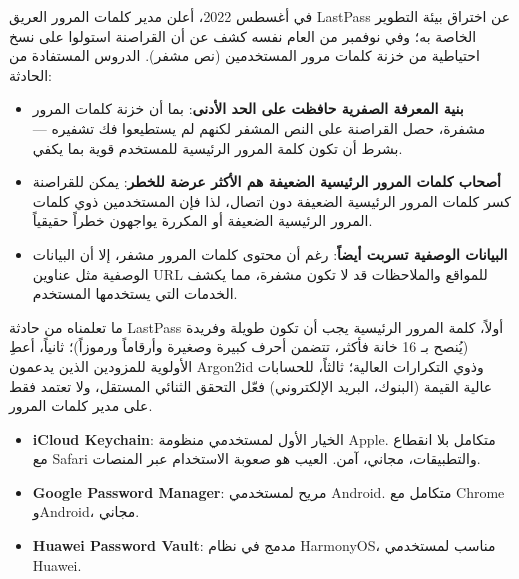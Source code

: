 
في أغسطس 2022، أعلن مدير كلمات المرور العريق LastPass عن اختراق بيئة التطوير الخاصة به؛ وفي نوفمبر من العام نفسه كشف عن أن القراصنة استولوا على نسخ احتياطية من خزنة كلمات مرور المستخدمين (نص مشفر). الدروس المستفادة من الحادثة:

\begin{itemize}
  \item \textbf{بنية المعرفة الصفرية حافظت على الحد الأدنى}: بما أن خزنة كلمات المرور مشفرة، حصل القراصنة على النص المشفر لكنهم لم يستطيعوا فك تشفيره — بشرط أن تكون كلمة المرور الرئيسية للمستخدم قوية بما يكفي.
  \item \textbf{أصحاب كلمات المرور الرئيسية الضعيفة هم الأكثر عرضة للخطر}: يمكن للقراصنة كسر كلمات المرور الرئيسية الضعيفة دون اتصال، لذا فإن المستخدمين ذوي كلمات المرور الرئيسية الضعيفة أو المكررة يواجهون خطراً حقيقياً.
  \item \textbf{البيانات الوصفية تسربت أيضاً}: رغم أن محتوى كلمات المرور مشفر، إلا أن البيانات الوصفية مثل عناوين URL للمواقع والملاحظات قد لا تكون مشفرة، مما يكشف الخدمات التي يستخدمها المستخدم.
\end{itemize}

\begin{tcbwarn}{ما تعلمناه من حادثة LastPass}
أولاً، كلمة المرور الرئيسية يجب أن تكون طويلة وفريدة (يُنصح بـ 16 خانة فأكثر، تتضمن أحرف كبيرة وصغيرة وأرقاماً ورموزاً)؛ ثانياً، أعطِ الأولوية للمزودين الذين يدعمون Argon2id وذوي التكرارات العالية؛ ثالثاً، للحسابات عالية القيمة (البنوك، البريد الإلكتروني) فعّل التحقق الثنائي المستقل، ولا تعتمد فقط على مدير كلمات المرور.

\end{tcbwarn}



\begin{itemize}
  \item \textbf{iCloud Keychain}: الخيار الأول لمستخدمي منظومة Apple. متكامل بلا انقطاع مع Safari والتطبيقات، مجاني، آمن. العيب هو صعوبة الاستخدام عبر المنصات.
  \item \textbf{Google Password Manager}: مريح لمستخدمي Android. متكامل مع Chrome وAndroid، مجاني.
  \item \textbf{Huawei Password Vault}: مدمج في نظام HarmonyOS، مناسب لمستخدمي Huawei.
\end{itemize}

